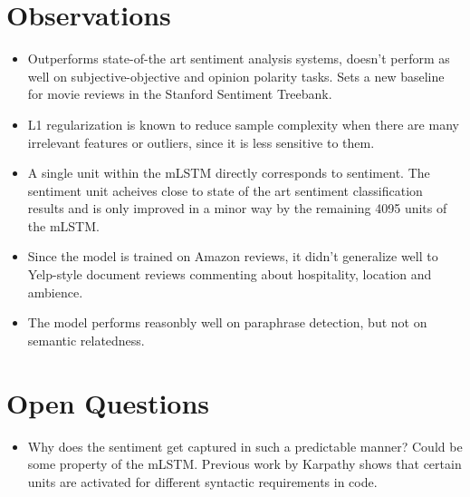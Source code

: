 \documentclass[12pt]{article}
\begin{document}
\section{Observations}
  \begin{itemize}
    \item Outperforms state-of-the art sentiment analysis systems, doesn't perform as well on subjective-objective and opinion polarity tasks. Sets a new baseline for movie reviews in the Stanford Sentiment Treebank.
    \item L1 regularization is known to reduce sample complexity when there are
    many irrelevant features or outliers, since it is less sensitive to them.
    \item A single unit within the mLSTM directly corresponds to sentiment. The sentiment unit acheives close to state of the art sentiment classification results and is only improved in a minor way by the remaining 4095 units of the mLSTM.
    \item Since the model is trained on Amazon reviews, it didn't generalize well to Yelp-style document reviews commenting about hospitality, location and ambience.
    \item The model performs reasonbly well on paraphrase detection, but not on semantic relatedness.
  \end{itemize}

\section{Open Questions}
  \begin{itemize}
    \item Why does the sentiment get captured in such a predictable manner? Could be some property of the mLSTM. Previous work by Karpathy \cite{karpathy2015visualizing} shows that certain units are activated for different syntactic requirements in code.
  \end{itemize}



\end{document}
